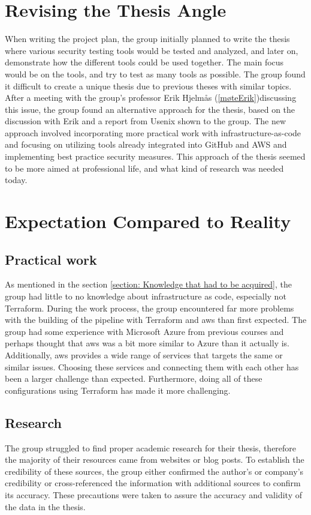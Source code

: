 \section{Revising the Thesis Angle}
When writing the project plan, the group initially planned to write the thesis where various security testing tools would be tested and analyzed, and later on, demonstrate how the different tools could be used together. The main focus would be on the tools, and try to test as many tools as possible. The group found it difficult to create a unique thesis due to previous theses with similar topics. 
\\
After a meeting with the group's professor Erik Hjelmås  (\ref{møteErik})discussing this issue, the group found an alternative approach for the thesis, based on the discussion with Erik and a report from Usenix \cite{usenixreport} shown to the group. The new approach involved incorporating more practical work with infrastructure-as-code and focusing on utilizing tools already integrated into GitHub and AWS and implementing best practice security measures. This approach of the thesis seemed to be more aimed at professional life, and what kind of research was needed today.  


\section{Expectation Compared to Reality}
\subsection{Practical work}
As mentioned in the section \ref{section: Knowledge that had to be acquired}, the group had little to no knowledge about \gls{infrastructure as code}, especially not Terraform. During the work process, the group encountered far more problems with the building of the pipeline with Terraform and \acrshort{aws} than first expected. The group had some experience with Microsoft Azure from previous courses and perhaps thought that \acrshort{aws} was a bit more similar to Azure than it actually is. Additionally, \acrshort{aws} provides a wide range of services that targets the same or similar issues. Choosing these services and connecting them with each other has been a larger challenge than expected. Furthermore, doing all of these configurations using Terraform has made it more challenging.

\subsection{Research}
The group struggled to find proper academic research for their thesis, therefore the majority of their resources came from websites or blog posts. To establish the credibility of these sources, the group either confirmed the author's or company's credibility or cross-referenced the information with additional sources to confirm its accuracy. These precautions were taken to assure the accuracy and validity of the data in the thesis.

